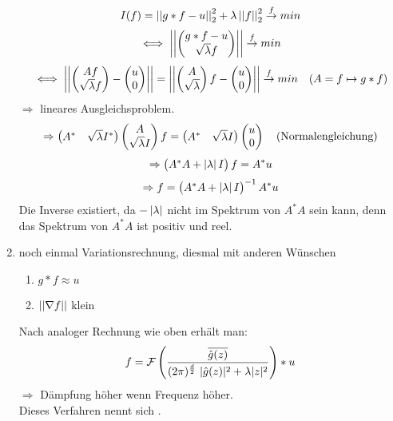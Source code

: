 \begin{enumerate}[label = \arabic*. Ansatz:]
                    \[I(f) = \left|\left| g*f-u \right|\right|_2^2 + \lambda \left|\left| f \right|\right|_2^2 \overset{f}{\to} min\]
                    \[\iff \left|\left| \begin{pmatrix} g*f-u\\ \sqrt{\lambda} f \end{pmatrix} \right|\right| \overset{f}{\to} min\]
                    \[\iff \left|\left| \begin{pmatrix} Af \\ \sqrt{\lambda}f \end{pmatrix} - \begin{pmatrix} u\\0 \end{pmatrix} \right|\right| = \left|\left| \begin{pmatrix} A \\ \sqrt{\lambda} \end{pmatrix}f - \begin{pmatrix} u\\0 \end{pmatrix} \right|\right| \overset{f}{\to} min \quad (A= f \mapsto g*f)\]
                    $\Rightarrow$ lineares Ausgleichsproblem.
                    \[\Rightarrow \begin{pmatrix} A^* &\sqrt{\lambda} I^* \end{pmatrix} \begin{pmatrix} A \\ \sqrt{\lambda}I \end{pmatrix}f = \begin{pmatrix} A^* & \sqrt{\lambda}I \end{pmatrix} \begin{pmatrix} u \\ 0 \end{pmatrix} \quad \text{(Normalengleichung)}\]
                    \[\Rightarrow \begin{pmatrix} A^*A + \left| \lambda \right|I \end{pmatrix}f=A^*u\]
                    \[\Rightarrow f= \begin{pmatrix} A^*A + \left| \lambda \right|I \end{pmatrix}^{-1}A^*u\]
                    Die Inverse existiert, da $-\left| \lambda \right|$ nicht im Spektrum von $A^*A$ sein kann, denn das Spektrum von $A^*A$ ist positiv und reel.
                    \item noch einmal Variationsrechnung, diesmal mit anderen Wünschen
                    \begin{enumerate}[label = \arabic*. Wunsch:]
                        \item $g *f \approx u$
                        \item $\left|\left| \nabla f \right|\right|$ klein
                    \end{enumerate}
                    Nach analoger Rechnung wie oben erhält man:
                    \begin{equation}
                        f=\mathcal F \left( \frac{\overline{\hat g(z)}}{(2\pi)^\frac{d}{2} \ |\hat g(z)|^2 + \lambda |z|^2} \right) * u
                    \end{equation}
                    $\Rightarrow$ Dämpfung höher wenn Frequenz höher.\\
                    Dieses Verfahren nennt sich .
                \end{enumerate}

